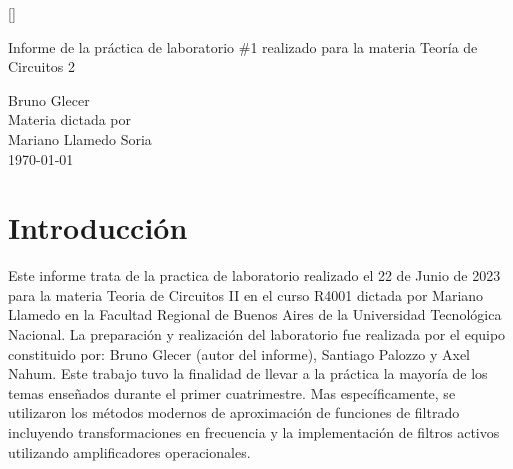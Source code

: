 \documentclass[11pt,a4paper]{report}
\begin{document}
\begin{titlepage}

\titleformat{\subsection}[runin]{}{}{}{}[]

\centering
\vspace{7cm}
\huge Informe de la práctica de laboratorio \#1 realizado para la materia Teoría de Circuitos 2\\
\vspace{2cm}


\Large Bruno Glecer\\
\vspace{2cm}
\large Materia dictada por\\
\large Mariano Llamedo Soria\\
\vspace{2cm}
\daymonthyear\today \\
\vspace{1cm}
\end{titlepage}



\chapter*{\centering\Large\bfseries Introducción}

Este informe trata de la practica de laboratorio realizado el 22 de Junio de 2023 para la materia Teoria de Circuitos II en el curso R4001 dictada por Mariano Llamedo en la Facultad Regional de Buenos Aires de la Universidad Tecnológica Nacional. La preparación y realización del laboratorio fue realizada por el equipo constituido por: Bruno Glecer (autor del informe), Santiago Palozzo y Axel Nahum. Este trabajo tuvo la finalidad de llevar a la práctica la mayoría de los temas enseñados durante el primer cuatrimestre. Mas específicamente, se utilizaron los métodos modernos de aproximación de funciones de filtrado incluyendo transformaciones en frecuencia y la implementación de filtros activos utilizando amplificadores operacionales.
\end{document}
